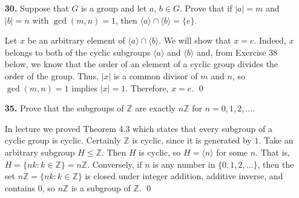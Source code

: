 \documentclass[12pt,reqno]{amsart}
\newcommand{\Z}{\ensuremath{\mathbb{Z}}}
\newcommand{\<}{\ensuremath{\langle}}
\renewcommand{\>}{\ensuremath{\rangle}}
\newcommand{\lcm}{\operatorname{lcm}}
\begin{document}
\begin{enumerate}
\medskip
{} If $\ell = \lcm(m,n)$, then $a^\ell$ generates 
$\langle a^m \rangle  \cap  \langle a^n \rangle$.
\begin{proof}
Let $x$ be an arbitrary non-identity element of 
$\langle a^m \rangle  \cap \langle a^n \rangle$.  We will show that 
$x = a^{\ell d}$
for some $d$, which will prove that $a^\ell$ generates 
$\langle a^m \rangle \cap \langle a^n \rangle$. 

As noted above, $x = a^{mj} = a^{nk}$, for some positive integers $j$ and
$k$. We can assume that $j$ and $k$ are the least positive integers with
these properties.  Then $mj = nk = t$, so $x = a^t$, where $t$ is a common multiple
of $m$ and $n$.  Since $\ell$ is the least common multiple, we have $\ell|t$, so
there exists $d$ such that $\ell d = t$.  Therefore, $x = a^t = a^{\ell d}$.
\end{proof}
\medskip 




\item[{\bf 30.}]
Suppose that $G$ is a group and let $a$, $b \in G$. Prove that if $|a|
= m$ and $|b| = n$ with $\gcd(m,n) = 1$, then 
$\langle a \rangle  \cap \langle b \rangle  = \{ e \}$. 
 
\medskip
{}
Let $x$ be an arbitrary element of $\<a\> \cap \<b\>$.  We will show that $x = e$.
Indeed, $x$ belongs to both of the cyclic subgroups $\<a\>$ and $\<b\>$ and, from
Exercise 38 below, we know that the order of an element of a cyclic 
group divides the order of the group.  Thus, $|x|$ is a common divisor of
$m$ and $n$, so $\gcd(m,n)=1$ implies $|x| = 1$. Therefore, $x=e$.
\qed
\medskip 

\item[{\bf 35.}]
Prove that the subgroups of ${\mathbb Z}$ are exactly $n{\mathbb Z}$ for $n
= 0, 1, 2, \ldots$. 

 
\medskip
{}
In lecture we proved Theorem 4.3 which states that every
subgroup of a cyclic group is cyclic.  Certainly $\Z$ is cyclic, since it is
generated by $1$.  Take an arbitrary subgroup $H\leq \Z$. Then $H$ is cyclic, so
$H = \<n\>$ for some $n$. That is, $H = \{nk : k \in \Z\} = n\Z$. Conversely, if
$n$ is any number in $\{0, 1, 2, \dots\}$, then the set $n\Z = \{nk: k\in \Z\}$
is closed under integer addition, additive inverse, and contains $0$, so $n\Z$
is a subgroup of $\Z$. 
\qed 
\medskip 


\end{enumerate}
\end{document}
